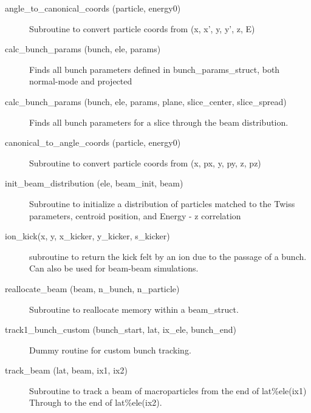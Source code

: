 \begin{description}

\label{r:angle.to.canonical.coords}
\item[angle_to_canonical_coords (particle, energy0)] \Newline 
Subroutine to convert particle coords from 
    (x, x', y, y', z, E)

\label{r:calc.bunch.params}
\item[calc_bunch_params (bunch, ele, params)] \Newline 
Finds all bunch parameters defined in bunch_params_struct, both normal-mode
and projected

\label{r:calc.bunch.params.slice}
\item[calc_bunch_params (bunch, ele, params, plane, slice_center, slice_spread)] \Newline 
Finds all bunch parameters for a slice through the beam distribution.

\label{r:canonical.to.angle.coords}
\item[canonical_to_angle_coords (particle, energy0)] \Newline 
Subroutine to convert particle coords from 
    (x, px, y, py, z, pz)

\label{r:init.beam.distribution}
\item[init_beam_distribution (ele, beam_init, beam)] \Newline 
Subroutine to initialize a distribution of particles matched to
the Twiss parameters, centroid position, and Energy - z correlation

\label{r:ion.kick}
\item[ion_kick(x, y, x_kicker, y_kicker, s_kicker)] \Newline 
    subroutine to return the kick felt by an ion due to the
    passage of a bunch. Can also be used for beam-beam simulations.

\label{r:reallocate.beam}
\item[reallocate_beam (beam, n_bunch, n_particle)] \Newline 
Subroutine to reallocate memory within a beam_struct.

\label{r:track1.bunch.custom}
\item[track1_bunch_custom (bunch_start, lat, ix_ele, bunch_end)] \Newline 
Dummy routine for custom bunch tracking. 

\label{r:track.beam}
\item[track_beam (lat, beam, ix1, ix2)] \Newline 
     Subroutine to track a beam of macroparticles from the end of
     lat\%ele(ix1) Through to the end of lat\%ele(ix2).

\end{description}

